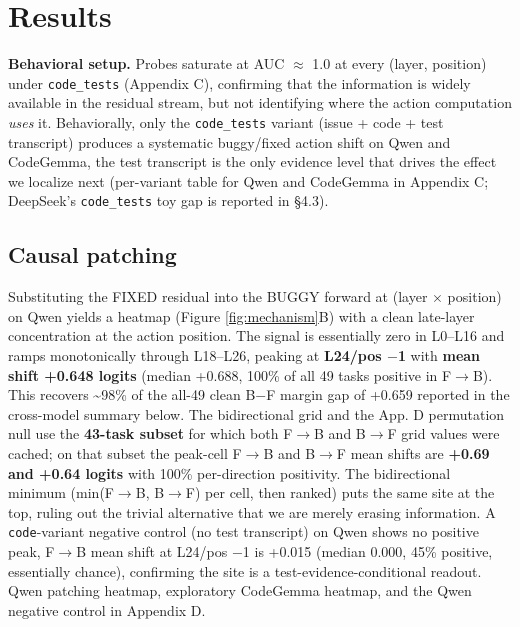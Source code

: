 \documentclass[
  11pt,
  a4paper]{article}
\begin{document}
\section{Results}\label{results}

\textbf{Behavioral setup.} Probes saturate at AUC \ensuremath{\approx} 1.0 at every (layer,
position) under \texttt{code\_tests} (Appendix C), confirming that the
information is widely available in the residual stream, but not
identifying where the action computation \emph{uses} it. Behaviorally,
only the \texttt{code\_tests} variant (issue + code + test transcript)
produces a systematic buggy/fixed action shift on Qwen and CodeGemma,
the test transcript is the only evidence level that drives the effect we
localize next (per-variant table for Qwen and CodeGemma in Appendix C;
DeepSeek's \texttt{code\_tests} toy gap is reported in \S{}4.3).

\subsection{Causal patching}\label{causal-patching}

Substituting the FIXED residual into the BUGGY forward at (layer \ensuremath{\times}
position) on Qwen yields a heatmap (Figure \ref{fig:mechanism}B) with a
clean late-layer concentration at the action position. The signal is
essentially zero in L0--L16 and ramps monotonically through L18--L26,
peaking at \textbf{L24/pos \ensuremath{-}1} with \textbf{mean shift +0.648 logits}
(median +0.688, 100\% of all 49 tasks positive in F\ensuremath{\rightarrow}B). This recovers
\textasciitilde98\% of the all-49 clean B\ensuremath{-}F margin gap of +0.659
reported in the cross-model summary below. The bidirectional grid and
the App. D permutation null use the \textbf{43-task subset} for which
both F\ensuremath{\rightarrow}B and B\ensuremath{\rightarrow}F grid values were cached; on that subset the peak-cell
F\ensuremath{\rightarrow}B and B\ensuremath{\rightarrow}F mean shifts are \textbf{+0.69 and +0.64 logits} with 100\%
per-direction positivity. The bidirectional minimum (min(F\ensuremath{\rightarrow}B, B\ensuremath{\rightarrow}F) per
cell, then ranked) puts the same site at the top, ruling out the trivial
alternative that we are merely erasing information. A
\texttt{code}-variant negative control (no test transcript) on Qwen
shows no positive peak, F\ensuremath{\rightarrow}B mean shift at L24/pos \ensuremath{-}1 is +0.015 (median
0.000, 45\% positive, essentially chance), confirming the site is a
test-evidence-conditional readout. Qwen patching heatmap, exploratory
CodeGemma heatmap, and the Qwen negative control in Appendix D.
\end{document}
